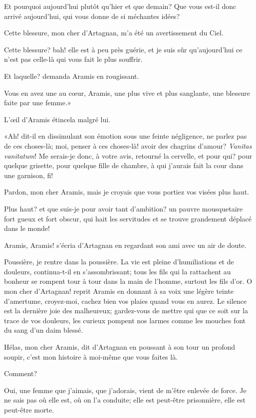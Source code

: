 \speak  Et pourquoi aujourd'hui plutôt qu'hier et que demain? Que vous est-il donc arrivé aujourd'hui, qui vous donne de si méchantes idées? 

\speak  Cette blessure, mon cher d'Artagnan, m'a été un avertissement du Ciel. 

\speak  Cette blessure? bah! elle est à peu près guérie, et je suis sûr qu'aujourd'hui ce n'est pas celle-là qui vous fait le plus souffrir. 

\speak  Et laquelle? demanda Aramis en rougissant. 

\speak  Vous en avez une au cœur, Aramis, une plus vive et plus sanglante, une blessure faite par une femme.» 

L'œil d'Aramis étincela malgré lui. 

«Ah! dit-il en dissimulant son émotion sous une feinte négligence, ne parlez pas de ces choses-là; moi, penser à ces choses-là! avoir des chagrins d'amour? \textit{Vanitas vanitatum}! Me serais-je donc, à votre avis, retourné la cervelle, et pour qui? pour quelque grisette, pour quelque fille de chambre, à qui j'aurais fait la cour dans une garnison, fi! 

\speak  Pardon, mon cher Aramis, mais je croyais que vous portiez vos visées plus haut. 

\speak  Plus haut? et que suis-je pour avoir tant d'ambition? un pauvre mousquetaire fort gueux et fort obscur, qui hait les servitudes et se trouve grandement déplacé dans le monde! 

\speak  Aramis, Aramis! s'écria d'Artagnan en regardant son ami avec un air de doute. 

\speak  Poussière, je rentre dans la poussière. La vie est pleine d'humiliations et de douleurs, continua-t-il en s'assombrissant; tous les fils qui la rattachent au bonheur se rompent tour à tour dans la main de l'homme, surtout les fils d'or. O mon cher d'Artagnan! reprit Aramis en donnant à sa voix une légère teinte d'amertume, croyez-moi, cachez bien vos plaies quand vous en aurez. Le silence est la dernière joie des malheureux; gardez-vous de mettre qui que ce soit sur la trace de vos douleurs, les curieux pompent nos larmes comme les mouches font du sang d'un daim blessé. 

\speak  Hélas, mon cher Aramis, dit d'Artagnan en poussant à son tour un profond soupir, c'est mon histoire à moi-même que vous faites là. 

\speak  Comment? 

\speak  Oui, une femme que j'aimais, que j'adorais, vient de m'être enlevée de force. Je ne sais pas où elle est, où on l'a conduite; elle est peut-être prisonnière, elle est peut-être morte. 

